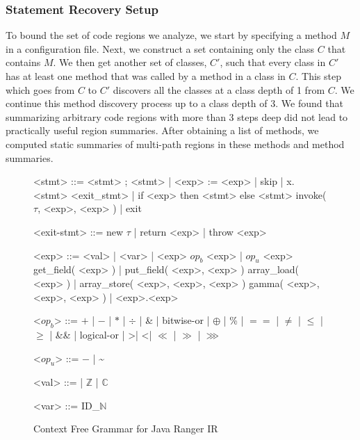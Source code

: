 \subsubsection{Statement Recovery Setup}
%
To bound the set of code regions we analyze, we start by specifying a method $M$ in a configuration file.
%
Next, we construct a set containing only the class $C$ that contains $M$.
%
We then get another set of classes, $C'$,
such that every class in $C'$ has at least one method that was called by a method in a class in $C$.
%
This step which goes from $C$ to $C'$ discovers all the classes at a class depth of 1 from $C$.
%
We continue this method discovery process up to a class depth of 3.
%
We found that summarizing
arbitrary code regions with more than 3 steps deep did not lead to practically useful region summaries.
%
After obtaining a list of methods, we computed static summaries of multi-path regions in these methods and method summaries.
%
\begin{figure}
\begin{grammar}
<stmt> ::= <stmt> ; <stmt> | <exp> := <exp> | skip | x.<stmt> 
\alt <exit_stmt> | if <exp> then <stmt> else <stmt> 
\alt invoke( $\tau$, <exp>, <exp> )  | exit

<exit-stmt> ::=  new $\tau$  | return <exp> |  throw <exp> 

<exp>  ::= <val> | <var> | <exp> $op_b$ <exp> | $op_u$ <exp>
\alt get_field( <exp> ) | put_field( <exp>, <exp> )
\alt array_load( <exp> ) | array_store( <exp>, <exp>, <exp> ) 
\alt gamma( <exp>, <exp>, <exp> ) | <exp>.<exp>

<$op_b$> ::= $+$ | $-$ | $*$ | $\div$ | \& | bitwise-or | $\oplus$ | \% | $==$ | $\neq$ | $\leq$ | $\geq$ | \&\& | logical-or | \textgreater | \textless | $\ll$ | $\gg$ | $\ggg$

<$op_u$> ::= $-$ | \textasciitilde

<val> ::= \unit | $\mathbb{Z}$ |  $\mathbb{C}$

<var> ::= ID_$\mathbb{N}$
\end{grammar}
\caption{Context Free Grammar for Java Ranger IR}
\label{fig:grammar}
\end{figure}


